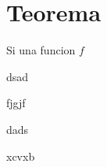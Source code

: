 \section{Teorema}
\begin{theorem}
Si una funcion $f$
\end{theorem}

\begin{corollary}
dsad
\end{corollary}

\begin{lemma}
fjgjf
\end{lemma}

\begin{definition}
dads
\end{definition}

\begin{remark}
xcvxb
\end{remark}